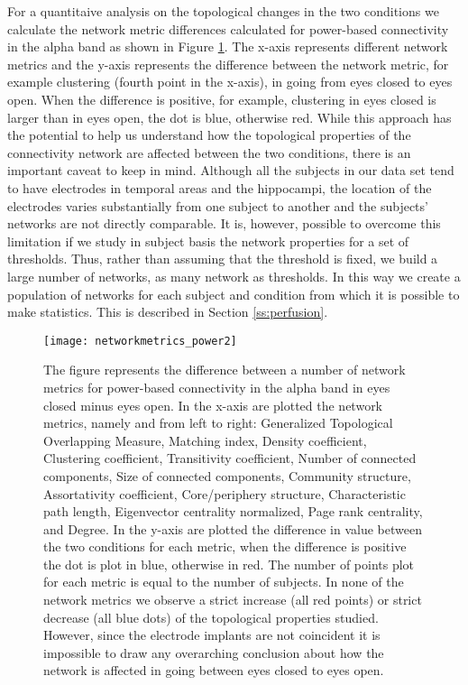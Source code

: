 \documentclass[11pt, onecolumn]{article}
\begin{document}
For a quantitaive analysis on the topological changes in the two conditions we calculate the network metric differences calculated for power-based connectivity in the alpha band as shown in Figure \ref{fig:networkmetrics_power}. The x-axis represents different network metrics and the y-axis represents the difference between the network metric, for example clustering (fourth point in the x-axis), in going from eyes closed to eyes open. When the difference is positive, for example, clustering in eyes closed is larger than in eyes open, the dot is blue, otherwise red. While this approach has the potential to help us understand how the topological properties of the connectivity network are affected between the two conditions, there is an important caveat to keep in mind.
Although all the subjects in our data set tend to have electrodes in temporal areas and the hippocampi, the location of the electrodes varies substantially from one subject to another and the subjects’ networks are not directly comparable. 
It is, however, possible to overcome this limitation if we study in subject basis the network properties for a set of thresholds. Thus, rather than assuming that the threshold is fixed, we build a large number of networks,  as many network as thresholds. In this way we create a population of networks for each subject and condition from which it is possible to make statistics. This is described in Section  \ref{ss:perfusion}.

\begin{figure}[H]
        \centering
        \texttt{[image: networkmetrics\_power2]}
        \vspace{-1em}
        \caption{The figure represents the difference between a number of network metrics for power-based connectivity in the alpha band in eyes closed minus eyes open. In the x-axis are plotted the network metrics, namely and from left to right: Generalized Topological Overlapping Measure, Matching index, Density coefficient, Clustering coefficient, Transitivity coefficient,  Number of connected components, Size of connected components, Community structure, Assortativity coefficient, Core/periphery structure, Characteristic path length, Eigenvector centrality normalized, Page rank centrality, and Degree. In the y-axis are plotted the difference in value between the two conditions for each metric, when the difference is positive the dot is plot in blue, otherwise in red. The number of points plot for each metric is equal to the number of subjects. In none of the network metrics we observe a strict increase (all red points) or strict decrease (all blue dots) of the topological properties studied. However, since the electrode implants are not coincident it is impossible to draw any overarching conclusion about how the network is affected in going between eyes closed to eyes open.}
\label{fig:networkmetrics_power}

\end{figure}
\end{document}
